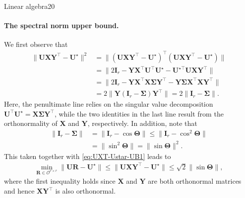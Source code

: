 \documentclass{article}
\begin{document}
\begin{problem}{Linear algebra}{20}
{\paragraph{The spectral norm upper bound.}
We first observe that
%
\begin{align}
\|\bm{U}\bm{X}\bm{Y}^{\top}-\bm{U}^{\star}\|^{2} & =\|(\bm{U}\bm{X}\bm{Y}^{\top}-\bm{U}^{\star})^{\top}(\bm{U}\bm{X}\bm{Y}^{\top}-\bm{U}^{\star})\|\nonumber\\
 & =\|2\bm{I}_{r}-\bm{Y}\bm{X}^{\top}\bm{U}^{\top}\bm{U}^{\star}-\bm{U}^{\star\top}\bm{U}\bm{X}\bm{Y}^{\top}\| \nonumber\\
	& =\|2\bm{I}_{r}-\bm{Y}\bm{X}^{\top}\bm{X}\bm{\Sigma}\bm{Y}^{\top}-\bm{Y}\bm{\Sigma}\bm{X}^{\top}\bm{X}\bm{Y}^{\top}\| \nonumber\\
 & =2\|\bm{Y}(\bm{I}_{r}-\bm{\Sigma})\bm{Y}^{\top}\|=2\|\bm{I}_{r}-\bm{\Sigma}\|.
	\label{eq:UXT-Ustar-UB1}
\end{align}
%
Here, the penultimate line relies on the singular value decomposition $\bm{U}^{\top}\bm{U}^{\star}=\bm{X}\bm{\Sigma}\bm{Y}^{\top}$,
while the two identities in the last line result from  the orthonormality of $\bm{X}$ and $\bm{Y}$, respectively. In addition, note that
%
\begin{align*}
	\|\bm{I}_{r}-\bm{\Sigma}\| &= \|\bm{I}_{r}-\cos\bm{\Theta}\|\leq\|\bm{I}_{r}-\cos^{2}\bm{\Theta}\| \\
	& =\|\sin^{2}\bm{\Theta}\|=\|\sin\bm{\Theta}\|^2.
\end{align*}
%
This taken together with \eqref{eq:UXT-Ustar-UB1} leads to
%
\begin{align*}
	\min_{\bm{R}\in \mathcal{O}^{r\times r}}\big\|\bm{U}\bm{R}-\bm{U}^{\star}\big\|
	\leq \big\|\bm{U}\bm{X}\bm{Y}^{\top}-\bm{U}^{\star}\big\| \leq \sqrt{2} \|\sin \bm{\Theta} \| ,
\end{align*}
%
where the first inequality holds since $\bm{X}$ and $\bm{Y}$ are both orthonormal matrices and hence $\bm{X}\bm{Y}^{\top}$ is also orthonormal.



}
\end{problem}
\end{document}
